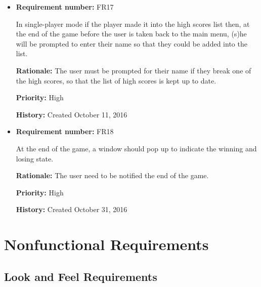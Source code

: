 \documentclass[12pt,letterpaper]{article}
\begin{document}
\begin{reqbox}
	\begin{itemize}
		\item \textbf{Requirement number: }FR17

		In single-player mode if the player made it into the high scores list then, at the end of the game before the user is taken back to the main menu, (s)he will be prompted to enter their name so that they could be added into the list.

		\textbf{Rationale: }The user must be prompted for their name if they break one of the high scores, so that the list of high scores is kept up to date.

		\textbf{Priority: }High

		\textbf{History: }Created October 11, 2016
	\end{itemize}
\end{reqbox}

\begin{reqbox}
	\begin{itemize}
		\item \textbf{Requirement number: }FR18

		At the end of the game, a window should pop up to indicate the winning and losing state.

		\textbf{Rationale: }The user need to be notified the end of the game.

		\textbf{Priority: }High

		\textbf{History: }Created October 31, 2016
	\end{itemize}
\end{reqbox}
		

\section{Nonfunctional Requirements}
\subsection{Look and Feel Requirements}
\end{document}
